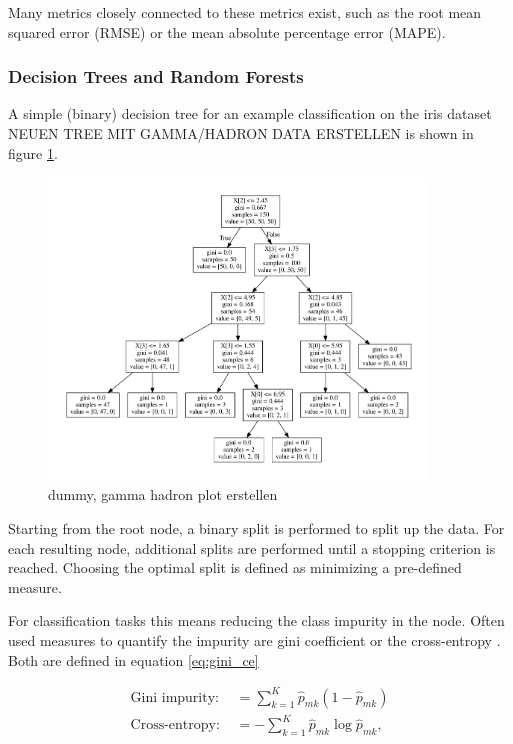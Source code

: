 Many metrics closely connected to these metrics exist, such as the root mean squared error (RMSE)
or the mean absolute percentage error (MAPE).

\subsubsection{Decision Trees and Random Forests}
A simple (binary) decision tree
for an example classification on the iris dataset 
NEUEN TREE MIT GAMMA/HADRON DATA ERSTELLEN
is shown in figure \ref{fig:03_tree}.

\begin{figure}
  \centering
  \captionsetup{width=0.9\linewidth}
  \includegraphics[width=0.9\textwidth]{Plots/decision_tree.pdf}
  \caption{dummy, gamma hadron plot erstellen}
  \label{fig:03_tree}
\end{figure}

Starting from the root node, a binary split is performed to
split up the data. For each resulting node, additional splits are performed
until a stopping criterion is reached.
Choosing the optimal split is defined as minimizing a
pre-defined measure.

For classification tasks this means reducing the class impurity in the node.
Often used measures
to quantify the impurity are gini coefficient or the
cross-entropy \cite{hastie2017springer}.
Both are defined in equation \ref{eq:gini_ce}

\begin{align}
	\text{Gini impurity: } &= \sum_{k=1}^K \hat{p}_{mk}(1-\hat{p}_{mk}) \\
	\text{Cross-entropy: } &= -\sum_{k=1}^K \hat{p}_{mk}\log{\hat{p}_{mk}},
  \label{eq:gini_ce}
\end{align}

